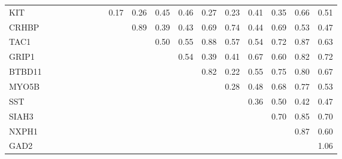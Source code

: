 \begin{longtable}{lrrrrrrrrrrrrrrrrr}
KIT     &              &             &            &             &             &               &           &        0.17 &       0.26 &        0.45 &         0.46 &        0.27 &      0.23 &        0.41 &        0.35 &       0.66 &          0.51 \\
CRHBP   &              &             &            &             &             &               &           &             &       0.89 &        0.39 &         0.43 &        0.69 &      0.74 &        0.44 &        0.69 &       0.53 &          0.47 \\
TAC1    &              &             &            &             &             &               &           &             &            &        0.50 &         0.55 &        0.88 &      0.57 &        0.54 &        0.72 &       0.87 &          0.63 \\
GRIP1   &              &             &            &             &             &               &           &             &            &             &         0.54 &        0.39 &      0.41 &        0.67 &        0.60 &       0.82 &          0.72 \\
BTBD11  &              &             &            &             &             &               &           &             &            &             &              &        0.82 &      0.22 &        0.55 &        0.75 &       0.80 &          0.67 \\
MYO5B   &              &             &            &             &             &               &           &             &            &             &              &             &      0.28 &        0.48 &        0.68 &       0.77 &          0.53 \\
SST     &              &             &            &             &             &               &           &             &            &             &              &             &           &        0.36 &        0.50 &       0.42 &          0.47 \\
SIAH3   &              &             &            &             &             &               &           &             &            &             &              &             &           &             &        0.70 &       0.85 &          0.70 \\
NXPH1   &              &             &            &             &             &               &           &             &            &             &              &             &           &             &             &       0.87 &          0.60 \\
GAD2    &              &             &            &             &             &               &           &             &            &             &              &             &           &             &             &            &          1.06 \\
\end{longtable}


